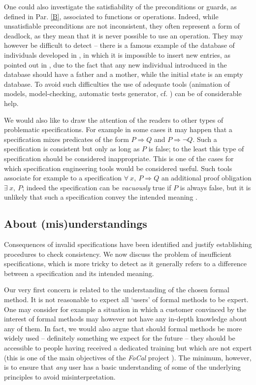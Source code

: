 \documentclass[conference]{IEEEtran}
\begin{document}
One could also investigate the satisfiability of the preconditions or guards, as defined in
Par. \ref{B}, associated to functions or operations. Indeed, while unsatisfiable preconditions
are not inconsistent, they often represent a form of deadlock, as they mean that it is never
possible to use an operation. They may however be difficult to detect -- there is a famous
example of the database of individuals developed in \cite{abr:1}, in which it is impossible to
insert new entries, as pointed out in \cite{mus:1}, due to the fact that any new individual
introduced in the database should have a father and a mother, while the initial state is an
empty database. To avoid such difficulties the use of adequate tools (animation of models,
model-checking, automatic tests generator, cf.
\cite{CarlierD2008,B07-JaffuelL,ClarkeGL96,PlaggeL07,YuML99}) can be of considerable help.

We would also like to draw the attention of the readers to other types of problematic 
specifications. For example in some cases it may happen that a specification mixes predicates
of the form {\small$P\!\Rightarrow\!Q$} and {\small$P\!\Rightarrow\!\lnot Q$}. Such a
specification is consistent but only as long as {\small$P$} is false; to the least this type
of specification should be considered inappropriate. This is one of the cases for which
specification engineering tools would be considered useful. Such tools associate for example
to a specification {\small$\forall\:x,\:P\!\Rightarrow\!Q$} an additional proof obligation
{\small$\exists\:x,\:P$}; indeed the specification can be \emph{vacuously} true if {\small$P$}
is always false, but it is unlikely that such a specification convey the intended meaning
\cite{DBLP:conf/lpar/SamerV07}.

\subsection{About (mis)understandings}\label{misunderstandings}

Consequences of invalid specifications have been identified and justify establishing
procedures to check consistency. We now discuss the problem of insufficient specifications,
which is more tricky to detect as it generally refers to a difference between a specification
and its intended meaning.

Our very first concern is related to the understanding of the chosen formal method. It is
not reasonable to expect all `users' of formal methods to be expert. One may consider for
example a situation in which a customer convinced by the interest of formal methods may
however not have any in-depth knowledge about any of them. In fact, we would also argue that
should formal methods be more widely used -- definitely something we expect for the future --
they should be accessible to people having received a dedicated training but which are not
expert (this is one of the main objectives of the \emph{FoCal} project
\cite{focal,TFTP04,TPHOL2003,calc03}). The minimum, however, is to ensure that \emph{any} user
has a basic understanding of some of the underlying principles to avoid misinterpretation.
\end{document}
